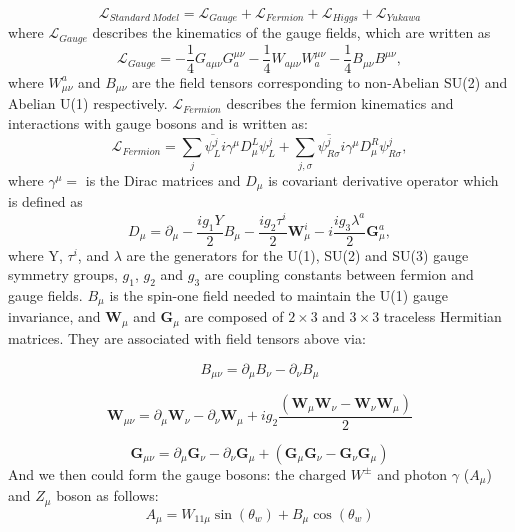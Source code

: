 \begin{equation}
  \mathcal{L}_{Standard\ Model}= \mathcal{L}_{Gauge}+ \mathcal{L}_{Fermion}+ \mathcal{L}_{Higgs}+ \mathcal{L}_{Yukawa}
  \label{eq:Standard Modelall}
\end{equation}
where $\mathcal{L}_{Gauge}$ describes the kinematics of the gauge fields, which are written as
\begin{equation}
  \mathcal{L}_{Gauge}= -\frac{1}{4}G_{a\mu\nu}G^{\mu\nu}_a - \frac{1}{4}W_{a\mu\nu}W^{\mu\nu}_a - \frac{1}{4}B_{\mu\nu}B^{\mu\nu},
\end{equation}
where $W_{\mu\nu}^a$ and $B_{\mu\nu}$ are the field tensors corresponding to non-Abelian SU(2) and Abelian U(1) respectively.
$\mathcal{L}_{Fermion}$ describes the fermion kinematics and interactions with gauge bosons and is written as:
\begin{equation}
  \mathcal{L}_{Fermion}=\sum_j \overline{\psi^j_L}i\gamma^\mu D^L_\mu \psi^j_L + \sum_{j, \sigma} \overline{\psi^j_{R\sigma}}i\gamma^{\mu}D^R_{\mu}\psi^j_{R\sigma},
  \label{eq:smf}
\end{equation}
where $\gamma^{\mu}=$ is the Dirac matrices and $D_{\mu}$ is covariant derivative operator which is defined as 
\begin{equation}
  D_\mu=\partial_\mu-\frac{ig_1Y}{2}B_\mu-\frac{ig_2\tau^i}{2}\mathbf{W}^i_\mu-i\frac{ig_3\lambda^a}{2}\mathbf{G}^a_\mu,
  \label{eq:dirac}
\end{equation}
where Y, $\tau^i$, and $\lambda$ are the generators for the U(1), SU(2) and SU(3) gauge symmetry groups, $g_1$, $g_2$ and $g_3$ 
are coupling constants between fermion and gauge fields. 
$B_\mu$ is the spin-one field needed to maintain the U(1) gauge invariance,
and $\mathbf{W}_\mu$ and $\mathbf{G}_\mu$ are composed of $2\times3$ and $3\times3$ traceless Hermitian matrices.
They are associated with field tensors above via:

\begin{equation*}
  B_{\mu\nu}=\partial_\mu B_\nu-\partial_\nu B_\mu
\end{equation*}

\begin{equation*}
  \mathbf{W}_{\mu\nu}=\partial_\mu\mathbf{W}_\nu-\partial_\nu\mathbf{W}_\mu+ig_2\frac{\left(\mathbf{W}_\mu\mathbf{W}_\nu-\mathbf{W}_\nu\mathbf{W}_\mu\right)}{2}
\end{equation*}

\begin{equation*}
  \mathbf{G}_{\mu\nu}=\partial_\mu\mathbf{G}_\nu-\partial_\nu\mathbf{G}_\mu+\left(\mathbf{G}_\mu\mathbf{G}_\nu-\mathbf{G}_\nu\mathbf{G}_\mu\right)
\end{equation*}
And we then could form the gauge bosons: the charged $W^{\pm}$ and photon $\gamma$ ($A_\mu$) and $Z_\mu$ boson as follows:
\begin{equation*}
  A_\mu=W_{11\mu}\sin\left(\theta_w\right)+B_\mu\cos\left(\theta_w\right)
\end{equation*}

